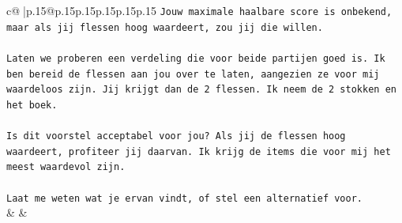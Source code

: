 \documentclass{article}
\begin{document}
{\begin{supertabular}{c@{$\;$}|p{.15\linewidth}@{}p{.15\linewidth}p{.15\linewidth}p{.15\linewidth}p{.15\linewidth}p{.15\linewidth}}
{{{\texttt{Jouw maximale haalbare score is onbekend, maar als jij flessen hoog waardeert, zou jij die willen.} \\
\\ 
\texttt{Laten we proberen een verdeling die voor beide partijen goed is. Ik ben bereid de flessen aan jou over te laten, aangezien ze voor mij waardeloos zijn. Jij krijgt dan de 2 flessen. Ik neem de 2 stokken en het boek.} \\
\\ 
\texttt{Is dit voorstel acceptabel voor jou? Als jij de flessen hoog waardeert, profiteer jij daarvan. Ik krijg de items die voor mij het meest waardevol zijn.} \\
\\ 
\texttt{Laat me weten wat je ervan vindt, of stel een alternatief voor.} \\
            }
        }
    }
    & & \\ \\


\end{supertabular}}
\end{document}
